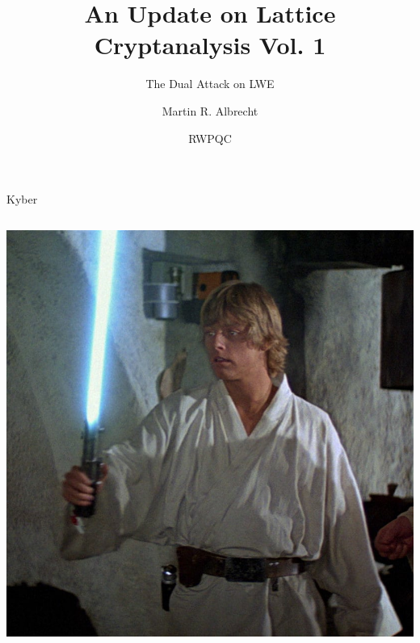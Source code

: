 \documentclass[xcolor=table,10pt,aspectratio=169]{beamer}
\institute{King's College London \& SandboxAQ}
\author{Martin R. Albrecht}
\date{RWPQC}
\title{An Update on Lattice Cryptanalysis Vol. 1}
\subtitle{The Dual Attack on LWE}
\begin{document}
\maketitle



\begin{frame}[label={sec:org89f83ec}]{Kyber}
\begin{columns}[t]
\begin{column}{0.5\columnwidth}
\begin{center}
\includegraphics[keepaspectratio,height=.75\textheight]{./lightsaber.jpeg}
\end{center}
\end{column}


\end{columns}
\end{frame}
\end{document}
